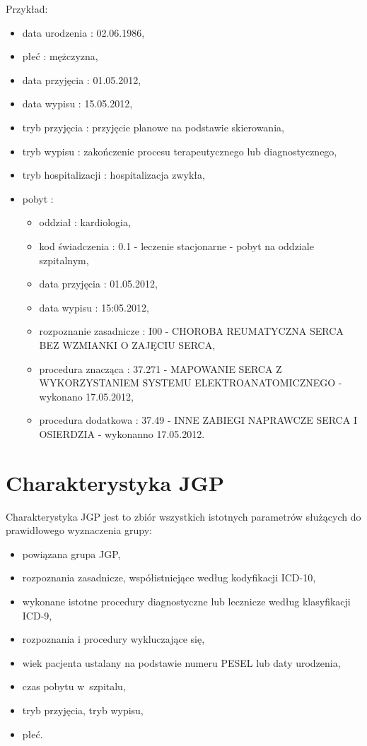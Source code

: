 Przykład:
\begin{itemize}
\item data urodzenia	: 02.06.1986,
\item płeć		: mężczyzna,
\item data przyjęcia	: 01.05.2012,
\item data wypisu	: 15.05.2012,
\item tryb przyjęcia	: przyjęcie planowe na podstawie skierowania,
\item tryb wypisu	: zakończenie procesu terapeutycznego lub diagnostycznego,
\item tryb hospitalizacji : hospitalizacja zwykła,
\item pobyt		:
 \begin{itemize}
 \item oddział		: kardiologia,
 \item kod świadczenia	: 0.1 - leczenie stacjonarne - pobyt na oddziale szpitalnym,
 \item data przyjęcia	: 01.05.2012,
 \item data wypisu	: 15:05.2012,
 \item rozpoznanie zasadnicze	: I00 - CHOROBA REUMATYCZNA SERCA BEZ WZMIANKI O ZAJĘCIU SERCA,
 \item procedura znacząca	: 37.271 - MAPOWANIE SERCA Z WYKORZYSTANIEM SYSTEMU ELEKTROANATOMICZNEGO - wykonano 17.05.2012,
 \item procedura dodatkowa	: 37.49 - INNE ZABIEGI NAPRAWCZE SERCA I OSIERDZIA - wykonanno 17.05.2012.
 \end{itemize}
\end{itemize}


\section{Charakterystyka JGP}
\label{sec:charakterystykaJGP}

Charakterystyka JGP jest to zbiór wszystkich istotnych parametrów służących do prawidłowego wyznaczenia grupy:
\begin{itemize}
\item powiązana grupa JGP,
\item rozpoznania zasadnicze, współistniejące według kodyfikacji ICD-10,
\item wykonane istotne procedury diagnostyczne lub lecznicze według klasyfikacji ICD-9,
\item rozpoznania i procedury wykluczające się,
\item wiek pacjenta ustalany na podstawie numeru PESEL lub daty urodzenia,
\item czas pobytu w~szpitalu,
\item tryb przyjęcia, tryb wypisu,
\item płeć.
\end{itemize}

